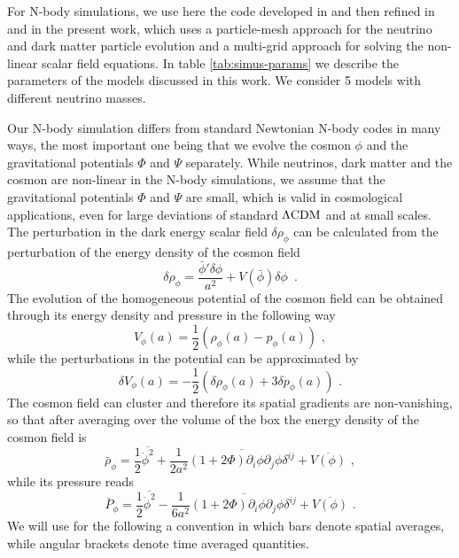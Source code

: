 For N-body simulations, we use here the code developed in \cite{ayaita_neutrino_2013,ayaita_nonlinear_2016,ayaita_structure_2012}
and then refined in \cite{fuhrer_backreaction_2015} and in the present
work, which uses a particle-mesh approach for the neutrino and dark
matter particle evolution and a multi-grid approach for solving the
non-linear scalar field equations. In table \ref{tab:simus-params}
we describe the parameters of the models discussed in this work.
We consider 5 models with different neutrino masses.

Our N-body simulation differs from standard Newtonian N-body codes
in many ways, the most important one being that we evolve the cosmon
$\phi$ and the gravitational potentials $\Phi$ and $\Psi$ separately.
While neutrinos, dark matter and the cosmon are non-linear in the
N-body simulations, we assume that the gravitational potentials $\Phi$
and $\Psi$ are small, which is valid in cosmological applications,
even for large deviations of standard $\Lambda\mathrm{CDM}$ and at small scales.
The perturbation in the dark energy scalar field $\delta\rho_{\phi}$
can be calculated from the perturbation of the energy density of the
cosmon field 
\begin{equation}
\delta\rho_{\phi}=\frac{\bar{\phi}'\delta\phi}{a^{2}}+V(\bar{\phi})\delta\phi\,\,\,.\label{eq:perturbed-cosmon}
\end{equation}
The evolution of the homogeneous potential of the cosmon field can
be obtained through its energy density and pressure in the following
way 
\begin{equation}
V_{\phi}(a)=\frac{1}{2}(\rho_{\phi}(a)-p_{\phi}(a))\,\,,
\end{equation}
while the perturbations in the potential can be approximated by 
\begin{equation}
\delta V_{\phi}(a)=-\frac{1}{2}(\delta\rho_{\phi}(a)+3\delta p_{\phi}(a))\,\,.
\end{equation}
The cosmon field can cluster and therefore its spatial gradients are
non-vanishing, so that after averaging over the volume of the box
the energy density of the cosmon field is 
\begin{equation}
\bar{\rho}_{\phi}=\frac{1}{2}\overline{\dot{\phi}^{2}}+\frac{1}{2a^{2}}\overline{(1+2\Phi)\partial_{i}\phi\partial_{j}\phi\delta^{ij}}+\overline{V(\phi)}\,\,,
\end{equation}
while its pressure reads 
\begin{equation}
\bar{P}_{\phi}=\frac{1}{2}\overline{\dot{\phi}^{2}}-\frac{1}{6a^{2}}\overline{(1+2\Phi)\partial_{i}\phi\partial_{j}\phi\delta^{ij}}+\overline{V(\phi)}\,\,.
\end{equation}
We will use for the following a convention in which bars denote spatial
averages, while angular brackets denote time averaged quantities.

